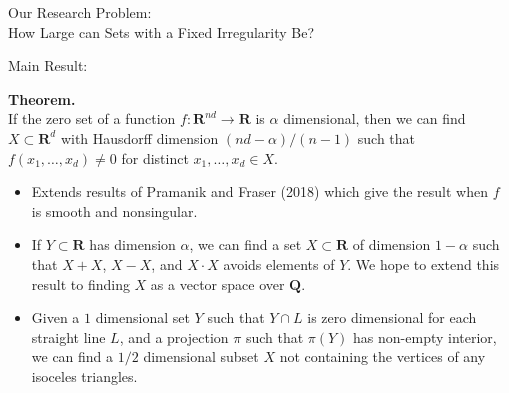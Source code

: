 \documentclass[final]{beamer}
\newlength{\twocolwid}
\begin{document}
\begin{frame}[t]
\begin{columns}[t]
\begin{column}{\twocolwid}
\begin{alertblock}{Our Research Problem:\\How Large can Sets with a Fixed Irregularity Be?}
\begin{itemize}
\end{itemize}

\end{alertblock}

\begin{alertblock}{Main Result:\\
}


\hspace{0.2cm}

\begin{center}
{\bf Theorem.}\\
If the zero set of a function $f: \mathbf{R}^{nd} \to \mathbf{R}$ is $\alpha$ dimensional, then we can find $X \subset \mathbf{R}^d$ with Hausdorff dimension $(nd - \alpha)/(n-1)$ such that $f(x_1, \dots, x_d) \neq 0$ for distinct $x_1, \dots, x_d \in X$.
\end{center}

\begin{itemize}
	\item Extends results of Pramanik and Fraser (2018) which give the result when $f$ is smooth and nonsingular.

	\item If $Y \subset \mathbf{R}$ has dimension $\alpha$, we can find a set $X \subset \mathbf{R}$ of dimension $1 - \alpha$ such that $X + X$, $X - X$, and $X \cdot X$ avoids elements of $Y$. We hope to extend this result to finding $X$ as a vector space over $\mathbf{Q}$.

	\item Given a $1$ dimensional set $Y$ such that $Y \cap L$ is zero dimensional for each straight line $L$, and a projection $\pi$ such that $\pi(Y)$ has non-empty interior, we can find a $1/2$ dimensional subset $X$ not containing the vertices of any isoceles triangles.
\end{itemize}

\end{alertblock} 

\begin{figure}
\end{figure}
\end{column}
\end{columns}
\end{frame}
\end{document}
